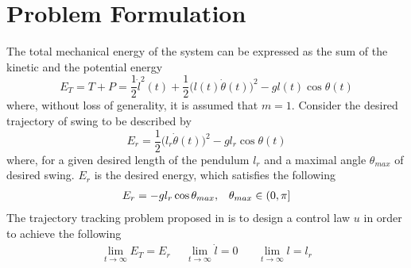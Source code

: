 \documentclass[main.tex]{subfiles}
\begin{document}
\section{Problem Formulation}
\label{sec:problem-formulation}
The total mechanical energy of the system can be expressed as the sum of the kinetic and the potential energy
\begin{equation} \label{total_energy}
    E_T = T+P = \frac{1}{2}\dot{l}^2(t)+\frac{1}{2}\big(l(t)\dot{\theta}(t)\big)^2-gl(t)\cos\theta(t) 
 \end{equation}
where, without loss of generality, it is assumed that $m = 1$. 
Consider the desired trajectory of swing to be described by
\begin{equation}
    E_r = \frac{1}{2}\big(l_r\dot{\theta}(t)\big)^2-gl_r\cos\theta(t) 
\end{equation}
where, for a given desired length of the pendulum $l_r$ and a maximal angle $\theta_{max}$ of desired swing. $E_r$ is the 
desired energy, which satisfies the following
\begin{eqnarray}
  \label{eq:Er-property}
 E_r = -gl_r\cos\theta_{max}, & \hfill &\theta_{max} \in (0,\pi]
\end{eqnarray}
 The trajectory tracking problem proposed in \cite{xin2014control} is to design a control law $u$ in order to achieve the following
 \begin{eqnarray} \label{control_obj}
  \lim_{t\rightarrow \infty} E_T = E_r  \ \ \ \ \ \  \lim_{t\rightarrow \infty} \dot{l} = 0 \ \ \ \ \ \  \ \ \lim_{t\rightarrow \infty} l = l_r
 \end{eqnarray}
\end{document}
